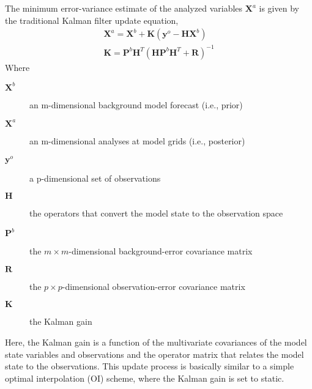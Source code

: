 The minimum error-variance estimate of the analyzed variables $\pmb{X}^a$ is given by the traditional Kalman filter update equation,
\begin{eqnarray}
\pmb{X}^a = \pmb{X}^b + \pmb{K} ( \pmb{y}^o - \pmb{H} \pmb{X}^b )   \label{ch6_eqn_xxkyhx}  \\
\pmb{K} = \pmb{P}^b \pmb{H}^{T} ( \pmb{H} \pmb{P}^b \pmb{H}^{T} + \pmb{R} )^{-1}  \label{ch6_eqn_kphhphr}
\end{eqnarray}
Where
\begin{description}
\item[$\pmb{X}^b$] an m-dimensional background model forecast (i.e., prior)
\item[$\pmb{X}^a$] an m-dimensional analyses at model grids (i.e., posterior)
\item[$\pmb{y}^o$] a p-dimensional set of observations
\item[$\pmb{H}$] the operators that convert the model state to the observation space
\item[$\pmb{P}^b$] the $m×m$-dimensional background-error covariance matrix
\item[$\pmb{R}$] the $p×p$-dimensional observation-error covariance matrix
\item[$\pmb{K}$] the Kalman gain
\end{description}

Here, the Kalman gain is a function of the multivariate covariances of the model state variables and observations and the operator matrix that relates the model state to the observations. This update process is basically similar to a simple optimal interpolation (OI) scheme, where the Kalman gain is set to static. 

